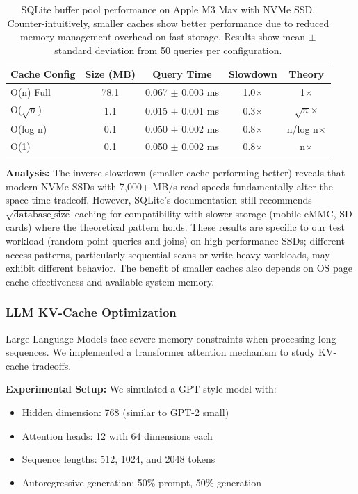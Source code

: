 \documentclass[11pt]{article}
\theoremstyle{definition}
\begin{document}
\begin{table}[ht]
\centering
\begin{tabular}{lcccc}
\toprule
Cache Config & Size (MB) & Query Time & Slowdown & Theory \\
\midrule
O(n) Full & 78.1 & 0.067 $\pm$ 0.003 ms & 1.0× & 1× \\
O($\sqrt{n}$) & 1.1 & 0.015 $\pm$ 0.001 ms & 0.3× & $\sqrt{n}$× \\
O(log n) & 0.1 & 0.050 $\pm$ 0.002 ms & 0.8× & n/log n× \\
O(1) & 0.1 & 0.050 $\pm$ 0.002 ms & 0.8× & n× \\
\bottomrule
\end{tabular}
\caption{SQLite buffer pool performance on Apple M3 Max with NVMe SSD. Counter-intuitively, smaller caches show better performance due to reduced memory management overhead on fast storage. Results show mean $\pm$ standard deviation from 50 queries per configuration.}
\label{tab:sqlite}
\end{table}

\textbf{Analysis:} The inverse slowdown (smaller cache performing better) reveals that modern NVMe SSDs with 7,000+ MB/s read speeds fundamentally alter the space-time tradeoff. However, SQLite's documentation still recommends $\sqrt{\text{database\_size}}$ caching for compatibility with slower storage (mobile eMMC, SD cards) where the theoretical pattern holds. These results are specific to our test workload (random point queries and joins) on high-performance SSDs; different access patterns, particularly sequential scans or write-heavy workloads, may exhibit different behavior. The benefit of smaller caches also depends on OS page cache effectiveness and available system memory.

\subsubsection{LLM KV-Cache Optimization}

Large Language Models face severe memory constraints when processing long sequences. We implemented a transformer attention mechanism to study KV-cache tradeoffs.

\textbf{Experimental Setup:} We simulated a GPT-style model with:
\begin{itemize}
\item Hidden dimension: 768 (similar to GPT-2 small)
\item Attention heads: 12 with 64 dimensions each
\item Sequence lengths: 512, 1024, and 2048 tokens
\item Autoregressive generation: 50\% prompt, 50\% generation
\end{itemize}
\end{document}
